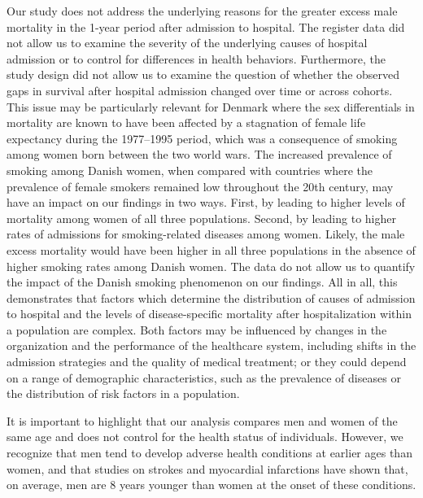 Our study does not address the underlying reasons for the greater excess 
male mortality in the 1-year period after admission to hospital. The 
register data did not allow us to examine the severity of the underlying 
causes of hospital admission or to control for differences in health 
behaviors. Furthermore, the study design did not allow us to examine the 
question of whether the observed gaps in survival after hospital admission 
changed over time or across cohorts. This issue may be particularly relevant 
for Denmark where the sex differentials in mortality are known to have 
been affected by a stagnation of female life expectancy during the 1977--1995 
period, which was a consequence of smoking among women born between the 
two world wars.\citep{jacobsen2016,lindahl2016did,jacobsen2008sex} The 
increased prevalence of smoking among Danish women, when compared with 
countries where the prevalence of female smokers remained low throughout 
the 20th century, may have an impact on our findings in two ways. First, 
by leading to higher levels of mortality among women of all three populations. 
Second, by leading to higher rates of admissions for smoking-related 
diseases among women. Likely, the male excess mortality would have been 
higher in all three populations in the absence of higher smoking rates 
among Danish women. The data do not allow us to quantify the impact of 
the Danish smoking phenomenon on our findings. All in all, this demonstrates 
that factors which determine the distribution of causes of admission to 
hospital and the levels of disease-specific mortality after hospitalization 
within a population are complex. Both factors may be influenced by changes 
in the organization and the performance of the healthcare system, including 
shifts in the admission strategies and the quality of medical treatment; 
or they could depend on a range of demographic characteristics, such as 
the prevalence of diseases or the distribution of risk factors in a 
population.\citep{hanlon2007analysis} 

It is important to highlight that our analysis compares men and women of 
the same age and does not control for the health status of individuals. 
However, we recognize that men tend to develop adverse health conditions 
at earlier ages than women,\citep{hubbard2011frailty,eskes2007women} and 
that studies on strokes and myocardial infarctions have shown that, on 
average, men are 8 years younger than women at the onset of these 
conditions.\citep{zhang2012age,berger2009sex,appelros2010review,appelros2009sex}

